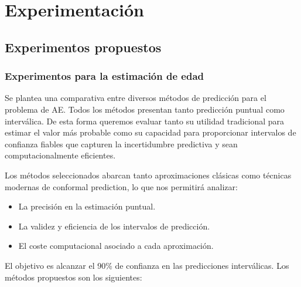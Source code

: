 \chapter{Experimentación}




\section{Experimentos propuestos}

\subsection{Experimentos para la estimación de edad}

Se plantea una comparativa entre diversos métodos de predicción para el problema de AE. 
Todos los métodos presentan tanto predicción puntual como interválica. De esta forma queremos evaluar
tanto su utilidad tradicional para estimar el valor más probable como su capacidad para proporcionar
intervalos de confianza fiables que capturen la incertidumbre predictiva y sean computacionalmente eficientes.

Los métodos seleccionados abarcan tanto aproximaciones clásicas como técnicas modernas de conformal prediction,
lo que nos permitirá analizar:
\begin{itemize}
    \item La precisión en la estimación puntual.
    \item La validez y eficiencia de los intervalos de predicción.
    \item El coste computacional asociado a cada aproximación.
\end{itemize}

El objetivo es alcanzar el 90\% de confianza en las predicciones interválicas. 
Los métodos propuestos son los siguientes: 

